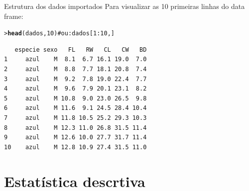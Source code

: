 \documentclass[10pt]{beamer}\usepackage{graphicx, color}
\makeatletter
\newcommand{\hlfunctioncall}[1]{\textcolor[rgb]{0,0,0.545098039215686}{\textbf{#1}}}%
\newcommand{\hlcomment}[1]{\textcolor[rgb]{0.2,0.2,0.2}{#1}}%
\newenvironment{kframe}{%
 \def\at@end@of@kframe{}%
 \ifinner\ifhmode%
  \def\at@end@of@kframe{\end{minipage}}%
  \begin{minipage}{\columnwidth}%
 \fi\fi%
 \def\FrameCommand##1{\hskip\@totalleftmargin \hskip-\fboxsep
 \colorbox{shadecolor}{##1}\hskip-\fboxsep
     \hskip-\linewidth \hskip-\@totalleftmargin \hskip\columnwidth}%
 \MakeFramed {\advance\hsize-\width
   \@totalleftmargin\z@ \linewidth\hsize
   \@setminipage}}%
 {\par\unskip\endMakeFramed%
 \at@end@of@kframe}
\newenvironment{knitrout}{}{} %
\makeatother
\begin{document}
\begin{frame}[fragile=singleslide]{Estrutura dos dados importados}
Para visualizar as 10 primeiras linhas do data frame:
\begin{knitrout}\small
{}\color{fgcolor}\begin{kframe}
\begin{alltt}
> \hlfunctioncall{head}(dados, 10) \hlcomment{# ou: dados[1:10,]}
\end{alltt}
\begin{verbatim}
   especie sexo   FL   RW   CL   CW   BD
1     azul    M  8.1  6.7 16.1 19.0  7.0
2     azul    M  8.8  7.7 18.1 20.8  7.4
3     azul    M  9.2  7.8 19.0 22.4  7.7
4     azul    M  9.6  7.9 20.1 23.1  8.2
5     azul    M 10.8  9.0 23.0 26.5  9.8
6     azul    M 11.6  9.1 24.5 28.4 10.4
7     azul    M 11.8 10.5 25.2 29.3 10.3
8     azul    M 12.3 11.0 26.8 31.5 11.4
9     azul    M 12.6 10.0 27.7 31.7 11.4
10    azul    M 12.8 10.9 27.4 31.5 11.0
\end{verbatim}
\end{kframe}
\end{knitrout}

\end{frame}


\section{Estatística descrtiva}
\end{document}
